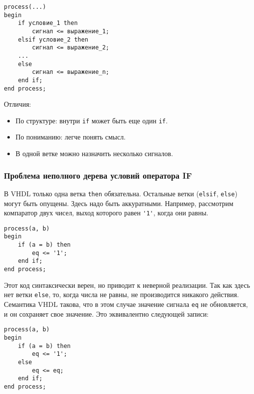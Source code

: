\begin{Code}
\begin{lstlisting}
process(...)
begin
    if условие_1 then
        сигнал <= выражение_1;
    elsif условие_2 then
        сигнал <= выражение_2;
    ...
    else
        сигнал <= выражение_n;
    end if;
end process; 
\end{lstlisting}
\end{Code}

Отличия:

\begin{itemize}
\item По структуре: внутри \lstinline?if? может быть еще один \lstinline?if?.
\item По пониманию: легче понять смысл.
\item В одной ветке можно назначить несколько сигналов.
\end{itemize}

\subsubsection{Проблема неполного дерева условий оператора IF}

В VHDL только одна ветка \lstinline?then? обязательна. Остальные ветки (\lstinline?elsif?, \lstinline?else?) могут быть опущены. Здесь надо быть аккуратными. Например, рассмотрим компаратор двух чисел, выход которого равен \lstinline?'1'?, когда они равны.

\begin{Code}
\begin{lstlisting}
process(a, b)
begin
    if (a = b) then
        eq <= '1';
    end if;
end process;
\end{lstlisting}
\end{Code}

Этот код синтаксически верен, но приводит к неверной реализации. Так как здесь нет ветки \lstinline?else?, то, когда числа не равны, не производится никакого действия. Семантика VHDL такова, что в этом случае значение сигнала \lstinline?eq? не обновляется, и он сохраняет свое значение. Это эквивалентно следующей записи:

\begin{Code}
\begin{lstlisting}
process(a, b)
begin
    if (a = b) then
        eq <= '1';
    else
        eq <= eq;
    end if;
end process;
\end{lstlisting}
\end{Code}

